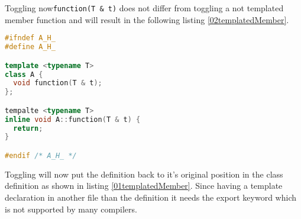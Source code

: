 Toggling now\texttt{function(T \& t)} does not differ from toggling a not
templated member function and will result in the following listing
\ref{02templatedMember}.

\begin{lstlisting}[caption={A.h, in header definition with template parameters},
label={02templatedMember}, language=C++]
#ifndef A_H_
#define A_H_

template <typename T>
class A {
  void function(T & t);
};

tempalte <typename T>
inline void A::function(T & t) {
  return;
}

#endif /* A_H_ */
\end{lstlisting}

Toggling will now put the definition back to it's original position in the class
definition as shown in listing \ref{01templatedMember}. Since having a template
declaration in another file than the definition it needs the export keyword
which is not supported by many compilers.
